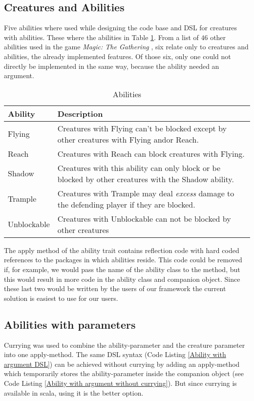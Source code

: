 \subsection{Creatures and Abilities}
Five abilities where used while designing the code base and DSL for creatures with abilities. These where the abilities in Table \ref{table:Abilities}. From a list of $46$ other abilities used in the game \textit{Magic: The Gathering} \cite{magic-abilities}, six relate only to creatures and abilities, the already implemented features. Of those six, only one could not directly be implemented in the same way, because the ability needed an argument.
\begin{table}[h]
\caption{Abilities}
\label{table:Abilities}
\begin{tabular}{|l|p{}|}
\hline
Ability & Description \\ \hline
Flying & Creatures with Flying can't be blocked except by other creatures with Flying and\/or Reach. \\
Reach & Creatures with Reach can block creatures with Flying. \\
Shadow & Creatures with this ability can only block or be  blocked by other creatures with the Shadow ability. \\
Trample & Creatures with Trample may deal \textit{excess} damage to the defending player if they are blocked. \\
Unblockable & Creatures with Unblockable can not be blocked by other creatures \\
\hline
\end{tabular}
\end{table}
The apply method of the ability trait contains reflection code with hard coded references to the packages in which abilities reside. This code could be removed if, for example, we would pass the name of the ability class to the method, but this would result in more code in the ability class and companion object. Since these last two would be written by the users of our framework the current solution is easiest to use for our users.

\subsection{Abilities with parameters}
Currying was used to combine the ability-parameter and the creature parameter into one apply-method. The same DSL syntax (Code Listing \ref{Ability with argument DSL}) can be achieved without currying by adding an apply-method which temporarily stores the ability-parameter inside the companion object (see Code Listing \ref{Ability with argument without currying}). But since currying is available in scala, using it is the better option.


